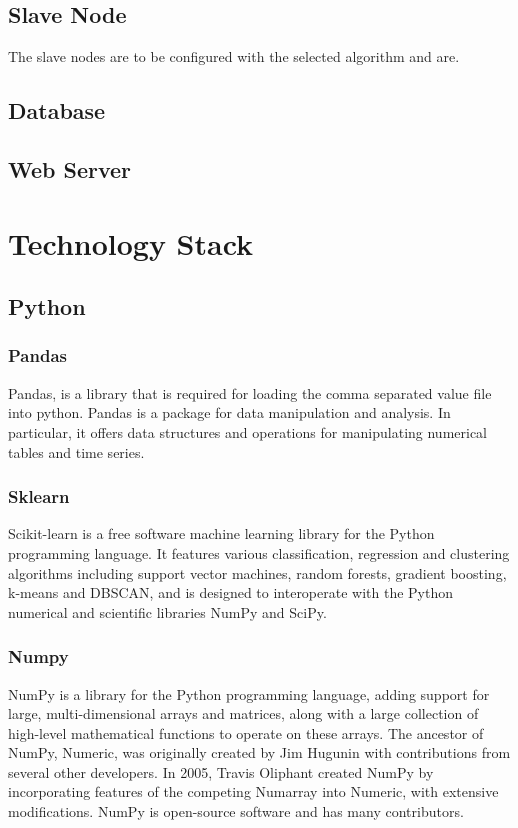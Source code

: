 \documentclass[12pt]{article}
\begin{document}
\subsection{Slave Node}
The slave nodes are to be configured with the selected algorithm and are.

\subsection{Database}

\subsection{Web Server}

\newpage
\section{Technology Stack}
\subsection{Python}
\subsubsection{Pandas}
Pandas, is a library that is required for loading the comma separated value file into python. Pandas is a package for data manipulation and analysis. In particular, it offers data structures and operations for manipulating numerical tables and time series.

\subsubsection{Sklearn}
Scikit-learn is a free software machine learning library for the Python programming language. It features various classification, regression and clustering algorithms including support vector machines, random forests, gradient boosting, k-means and DBSCAN, and is designed to interoperate with the Python numerical and scientific libraries NumPy and SciPy.

\subsubsection{Numpy}
NumPy is a library for the Python programming language, adding support for large, multi-dimensional arrays and matrices, along with a large collection of high-level mathematical functions to operate on these arrays. The ancestor of NumPy, Numeric, was originally created by Jim Hugunin with contributions from several other developers. In 2005, Travis Oliphant created NumPy by incorporating features of the competing Numarray into Numeric, with extensive modifications. NumPy is open-source software and has many contributors.
\end{document}
